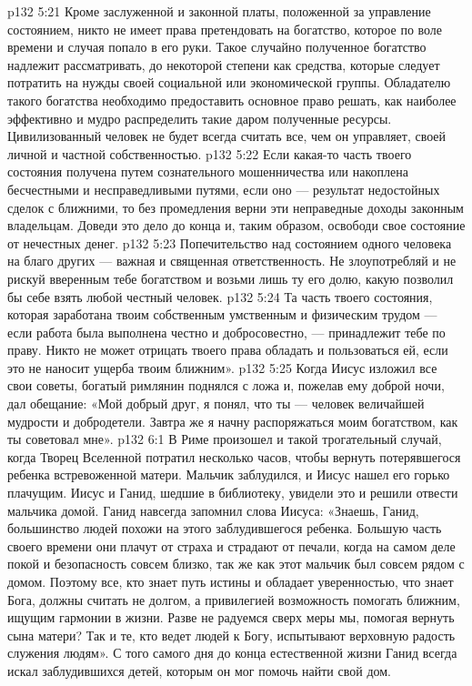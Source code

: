 \vs p132 5:21 \bibnobreakspace Кроме заслуженной и законной платы, положенной за управление состоянием, никто не имеет права претендовать на богатство, которое по воле времени и случая попало в его руки. Такое случайно полученное богатство надлежит рассматривать, до некоторой степени как средства, которые следует потратить на нужды своей социальной или экономической группы. Обладателю такого богатства необходимо предоставить основное право решать, как наиболее эффективно и мудро распределить такие даром полученные ресурсы. Цивилизованный человек не будет всегда считать все, чем он управляет, своей личной и частной собственностью.
\vs p132 5:22 \bibnobreakspace Если какая\hyp{}то часть твоего состояния получена путем сознательного мошенничества или накоплена бесчестными и несправедливыми путями, если оно --- результат недостойных сделок с ближними, то без промедления верни эти неправедные доходы законным владельцам. Доведи это дело до конца и, таким образом, освободи свое состояние от нечестных денег.
\vs p132 5:23 \bibnobreakspace Попечительство над состоянием одного человека на благо других --- важная и священная ответственность. Не злоупотребляй и не рискуй вверенным тебе богатством и возьми лишь ту его долю, какую позволил бы себе взять любой честный человек.
\vs p132 5:24 \bibnobreakspace Та часть твоего состояния, которая заработана твоим собственным умственным и физическим трудом --- если работа была выполнена честно и добросовестно, --- принадлежит тебе по праву. Никто не может отрицать твоего права обладать и пользоваться ей, если это не наносит ущерба твоим ближним».
\vs p132 5:25 \pc Когда Иисус изложил все свои советы, богатый римлянин поднялся с ложа и, пожелав ему доброй ночи, дал обещание: «Мой добрый друг, я понял, что ты --- человек величайшей мудрости и добродетели. Завтра же я начну распоряжаться моим богатством, как ты советовал мне».
\vs p132 6:1 В Риме произошел и такой трогательный случай, когда Творец Вселенной потратил несколько часов, чтобы вернуть потерявшегося ребенка встревоженной матери. Мальчик заблудился, и Иисус нашел его горько плачущим. Иисус и Ганид, шедшие в библиотеку, увидели это и решили отвести мальчика домой. Ганид навсегда запомнил слова Иисуса: «Знаешь, Ганид, большинство людей похожи на этого заблудившегося ребенка. Большую часть своего времени они плачут от страха и страдают от печали, когда на самом деле покой и безопасность совсем близко, так же как этот мальчик был совсем рядом с домом. Поэтому все, кто знает путь истины и обладает уверенностью, что знает Бога, должны считать не долгом, а привилегией возможность помогать ближним, ищущим гармонии в жизни. Разве не радуемся сверх меры мы, помогая вернуть сына матери? Так и те, кто ведет людей к Богу, испытывают верховную радость служения людям». С того самого дня до конца естественной жизни Ганид всегда искал заблудившихся детей, которым он мог помочь найти свой дом.
